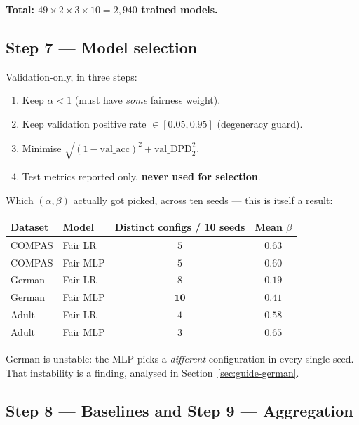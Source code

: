 \begin{center}
\textbf{Total: $49 \times 2 \times 3 \times 10 = 2{,}940$ trained models.}
\end{center}

\subsection{Step 7 --- Model selection}

Validation-only, in three steps:
\begin{enumerate}
\item Keep $\alpha < 1$ (must have \emph{some} fairness weight).
\item Keep validation positive rate $\in [0.05, 0.95]$ (degeneracy guard).
\item Minimise $\sqrt{(1-\text{val\_acc})^2 + \text{val\_DPD}_2^2}$.
\item Test metrics reported only, \textbf{never used for selection}.
\end{enumerate}

Which $(\alpha, \beta)$ actually got picked, across ten seeds --- this is itself
a result:

\begin{center}
\small
\begin{tabular}{@{}llcc@{}}
\toprule
\textbf{Dataset} & \textbf{Model} & \textbf{Distinct configs / 10 seeds} & \textbf{Mean $\beta$} \\
\midrule
COMPAS & Fair LR  & $5$  & $0.63$ \\
COMPAS & Fair MLP & $5$  & $0.60$ \\
German & Fair LR  & $8$  & $0.19$ \\
German & Fair MLP & $\mathbf{10}$ & $0.41$ \\
Adult  & Fair LR  & $4$  & $0.58$ \\
Adult  & Fair MLP & $3$  & $0.65$ \\
\bottomrule
\end{tabular}
\end{center}

German is unstable: the MLP picks a \emph{different} configuration in every
single seed. That instability is a finding, analysed in
Section~\ref{sec:guide-german}.

\subsection{Step 8 --- Baselines and Step 9 --- Aggregation}

